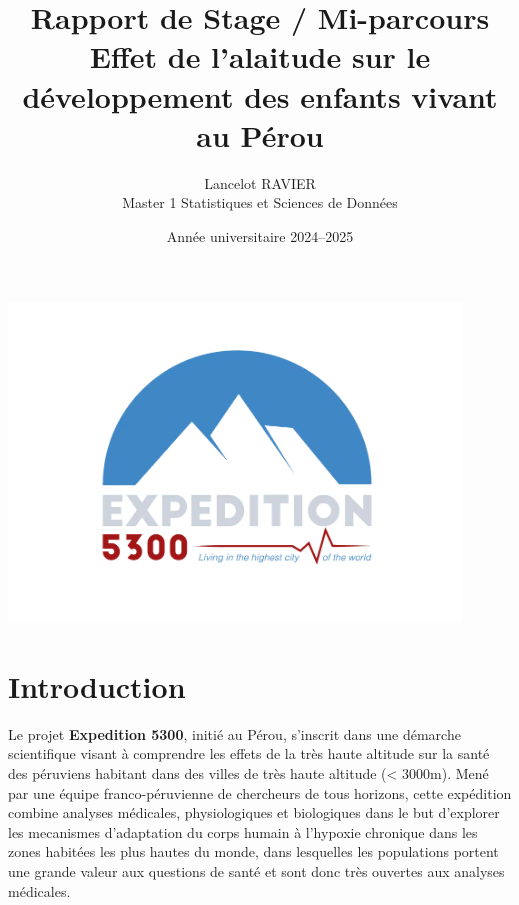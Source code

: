 \documentclass[12pt,a4paper]{article}
\title{
  \textbf{\LARGE Rapport de Stage / Mi-parcours} \\[1ex]
  \large Effet de l'alaitude sur le développement des enfants vivant au Pérou
}
\author{Lancelot RAVIER\\Master 1 Statistiques et Sciences de Données}
\date{Année universitaire 2024--2025}
\begin{document}
\maketitle
\begin{center}
\includegraphics[width=12cm]{logo.png} \\[2ex]
\end{center}
\thispagestyle{empty}
\newpage

\tableofcontents
\newpage

\section*{Introduction}
Le projet \textbf{Expedition 5300}, initié au Pérou, s'inscrit dans une démarche scientifique visant à comprendre les effets de la très haute altitude sur la santé des péruviens habitant dans des villes de très haute altitude (< 3000m). Mené par une équipe franco-péruvienne de chercheurs de tous horizons, cette expédition combine analyses médicales, physiologiques et biologiques dans le but d'explorer les mecanismes d'adaptation du corps humain à l'hypoxie chronique dans les zones habitées les plus hautes du monde, dans lesquelles les populations portent une grande valeur aux questions de santé et sont donc très ouvertes aux analyses médicales.
\end{document}
